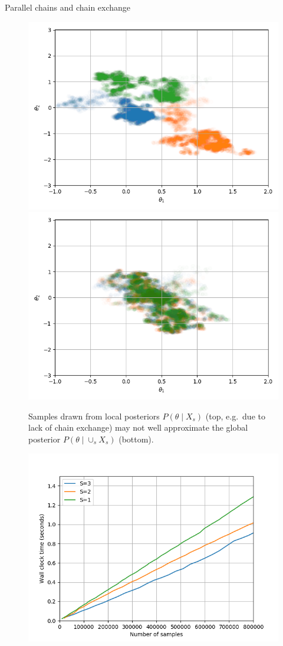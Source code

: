 \documentclass[final]{beamer}
\newlength{\onecolwid}
\newlength{\twocolwid}
\begin{document}
\begin{frame}[t]
\begin{columns}[t]
\begin{column}{\twocolwid}
\begin{columns}[t,totalwidth=\twocolwid]
\begin{column}{\onecolwid}
\begin{block}{Parallel chains and chain exchange}
  \begin{figure}
    \includegraphics[width=0.8\linewidth]{poster-figures/gaussian_no_exchange.png}\\
    \includegraphics[width=0.8\linewidth]{poster-figures/gaussian_exchange.png}
    \caption{Samples drawn from local posteriors $P(\theta \mid X_s)$ (top, e.g.\ due to lack
      of chain exchange) may not well approximate the global posterior
      $P(\theta \mid \cup_s X_s)$ (bottom).}
    \label{fig:samples}
  \end{figure}
  \vspace{-2cm}
  \begin{figure}
    \includegraphics[width=0.9\linewidth]{poster-figures/speedup-parallel.png}

\end{figure}
\end{block}
\end{column}
\end{columns}
\end{column}
\end{columns}
\end{frame}
\end{document}
